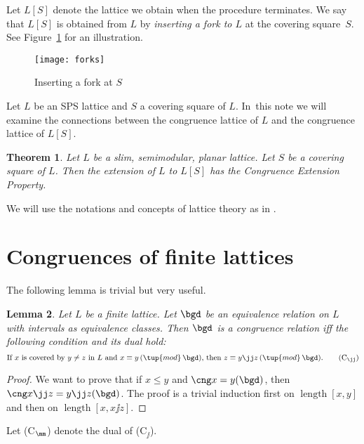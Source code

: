 \documentclass{amsart}
\theoremstyle{plain}
\newtheorem{theorem}{Theorem}
\newtheorem{lemma}[theorem]{Lemma}
\theoremstyle{definition}
\begin{document}
Let $L[S]$ denote the lattice we obtain when the procedure terminates. 
We say that $L[S]$ is obtained from
$L$ by \emph{inserting a fork to $L$} at the covering square~$S$.
See Figure~\ref{F:forks} for an illustration.

\begin{figure}[hbt]
\centerline{\texttt{[image: forks]}}
\caption{Inserting a fork at $S$}\label{F:forks}
\end{figure}

Let $L$ be an SPS lattice
and $S$ a covering square of $L$.
In~this note we will examine the connections between the congruence lattice of $L$ and the congruence lattice of $L[S]$.

\begin{theorem}\label{T:extension}
Let $L$ be a slim, semimodular, planar lattice. 
Let $S$ be a covering square of $L$.
Then the extension of $L$ to $L[S]$ 
has the Congruence Extension Property.
\end{theorem}

We will use the notations and concepts of lattice theory 
as in \cite{LTF}.

\section{Congruences of finite lattices}\label{S:Congruences}

The following lemma is trivial but very useful.

\begin{lemma}\label{L:technical}
Let $L$ be a finite lattice. 
Let $\bgd$ be an equivalence relation on $L$
with intervals as equivalence classes.
Then $\bgd$ is a congruence relation if{}f the following condition 
and its dual hold:
\begin{equation}\label{E:cover}
\text{If $x$ is covered by $y \neq z$ in $L$ 
and $x \equiv y\,(\tup{mod}\, \bgd)$,
then $z \equiv y \jj z\,(\tup{mod}\,\bgd)$.}\tag{C${}_{\jj}$}
\end{equation}
\end{lemma}

\begin{proof}
We want to prove that if $x \leq y$ and $\cng x=y (\bgd)$,
then $\cng x \jj z = y \jj z(\bgd)$.
The proof is a trivial induction first on $\operatorname{length}[x, y]$
and then on $\operatorname{length}[x, x \jj z]$.
\end{proof}

Let (C${}_{\mm}$) denote the dual of (C${}_{\jj}$).
\end{document}
